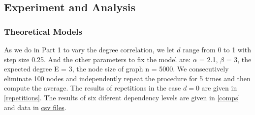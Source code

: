\documentclass{article}
\begin{document}
\subsection{Experiment and Analysis}

\subsubsection{Theoretical Models}

\par As we do in Part 1 to vary the degree correlation, we let $d$ range from 0 to 1 with step size 0.25. And the other parameters to fix the model are: $\alpha$ = 2.1, $\beta$ = 3, the expected degree E = 3, the node size of graph n = 5000. We consecutively eliminate 100 nodes and independently repeat the procedure for 5 times and then compute the average. The results of repetitions in the case $d=0$  are given in \ref{repetitions}. The results of six diferent dependency levels are given in \ref{comps} and data in \href{https://github.com/leahwu/DCM_simulaiton_and_analysis/tree/master/output_data/models2_ASPL_analysis}{csv files}.
\end{document}
